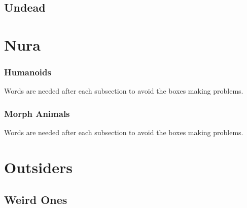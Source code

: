 \documentclass[a4paper,openany]{book}
\begin{document}
\section{Undead}

\begin{multicols}{2}

\ghoul

\ghast

\demilich

\lich

\end{multicols}

\chapter{Nura}

\begin{multicols}{2}

\subsection{Humanoids}
Words are needed after each subsection to avoid the boxes making problems.




\goblin

\goblin

\goblincaster

\hobgoblin

\ogre

\subsection{Morph Animals}
Words are needed after each subsection to avoid the boxes making problems.



\morphrat

\morphhorse

\morphcat

\morphslug

\morphspider

\morphwolf

\end{multicols}

\chapter{Outsiders}

\section{Weird Ones}
\end{document}
